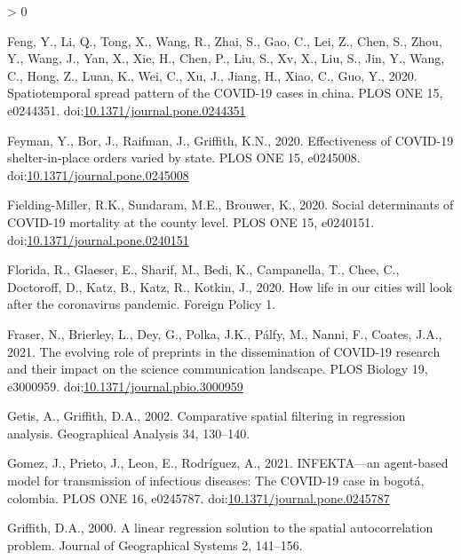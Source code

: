 \documentclass[]{elsarticle} %
\newlength{\cslhangindent}
\newenvironment{CSLReferences}[2] %
 {%
  \setlength{\parindent}{0pt}
  \ifodd #1 \everypar{\setlength{\hangindent}{\cslhangindent}}\ignorespaces\fi
  \ifnum #2 > 0
  \setlength{\parskip}{#2\baselineskip}
  \fi
 }%
 {}
\begin{document}
\begin{CSLReferences}{1}{0}
\leavevmode\hypertarget{ref-Feng2020spread}{}%
Feng, Y., Li, Q., Tong, X., Wang, R., Zhai, S., Gao, C., Lei, Z., Chen,
S., Zhou, Y., Wang, J., Yan, X., Xie, H., Chen, P., Liu, S., Xv, X.,
Liu, S., Jin, Y., Wang, C., Hong, Z., Luan, K., Wei, C., Xu, J., Jiang,
H., Xiao, C., Guo, Y., 2020. Spatiotemporal spread pattern of the
COVID-19 cases in china. PLOS ONE 15, e0244351.
doi:\href{https://doi.org/10.1371/journal.pone.0244351}{10.1371/journal.pone.0244351}

\leavevmode\hypertarget{ref-Feyman2020effectiveness}{}%
Feyman, Y., Bor, J., Raifman, J., Griffith, K.N., 2020. Effectiveness of
COVID-19 shelter-in-place orders varied by state. PLOS ONE 15, e0245008.
doi:\href{https://doi.org/10.1371/journal.pone.0245008}{10.1371/journal.pone.0245008}

\leavevmode\hypertarget{ref-Fielding2020social}{}%
Fielding-Miller, R.K., Sundaram, M.E., Brouwer, K., 2020. Social
determinants of COVID-19 mortality at the county level. PLOS ONE 15,
e0240151.
doi:\href{https://doi.org/10.1371/journal.pone.0240151}{10.1371/journal.pone.0240151}

\leavevmode\hypertarget{ref-Florida2020how}{}%
Florida, R., Glaeser, E., Sharif, M., Bedi, K., Campanella, T., Chee,
C., Doctoroff, D., Katz, B., Katz, R., Kotkin, J., 2020. How life in our
cities will look after the coronavirus pandemic. Foreign Policy 1.

\leavevmode\hypertarget{ref-Fraser2021evolving}{}%
Fraser, N., Brierley, L., Dey, G., Polka, J.K., Pálfy, M., Nanni, F.,
Coates, J.A., 2021. The evolving role of preprints in the dissemination
of COVID-19 research and their impact on the science communication
landscape. PLOS Biology 19, e3000959.
doi:\href{https://doi.org/10.1371/journal.pbio.3000959}{10.1371/journal.pbio.3000959}

\leavevmode\hypertarget{ref-Getis2002comparative}{}%
Getis, A., Griffith, D.A., 2002. Comparative spatial filtering in
regression analysis. Geographical Analysis 34, 130--140.

\leavevmode\hypertarget{ref-Gomez2021infekta}{}%
Gomez, J., Prieto, J., Leon, E., Rodríguez, A., 2021. INFEKTA---an
agent-based model for transmission of infectious diseases: The COVID-19
case in bogotá, colombia. PLOS ONE 16, e0245787.
doi:\href{https://doi.org/10.1371/journal.pone.0245787}{10.1371/journal.pone.0245787}

\leavevmode\hypertarget{ref-Griffith2000linear}{}%
Griffith, D.A., 2000. A linear regression solution to the spatial
autocorrelation problem. Journal of Geographical Systems 2, 141--156.


\end{CSLReferences}
\end{document}
